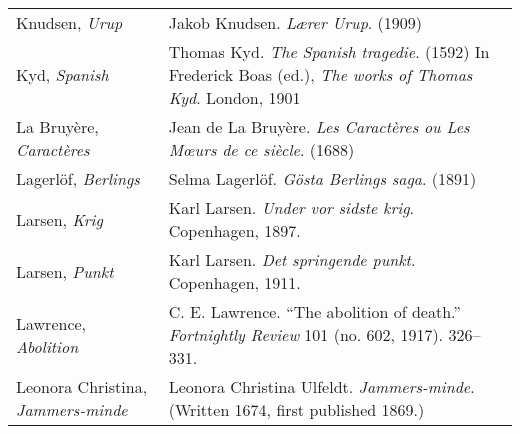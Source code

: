 \begin{longtable}{p{} p{}}
Knudsen, \textit{Urup} & Jakob Knudsen. \textit{Lærer Urup}. (1909) \\
%

Kyd, \textit{Spanish} & Thomas Kyd. \textit{The Spanish tragedie}. (1592) In Frederick Boas (ed.), \textit{The works of Thomas Kyd}. London, 1901 \\

La Bruyère, \textit{Caractères} & Jean de La Bruyère. \textit{Les Caractères ou Les Mœurs de ce siècle}. (1688) \\

Lagerlöf, \textit{Berlings} & Selma Lagerlöf. \textit{Gösta Berlings saga}. (1891) \\

Larsen, \textit{Krig} & Karl Larsen. \textit{Under vor sidste krig}. Copenhagen, 1897.\\
Larsen, \textit{Punkt} & Karl Larsen. \textit{Det springende punkt}. Copenhagen, 1911.\\

Lawrence, \textit{Abolition} & C. E. Lawrence. ``The abolition of death.'' \textit{Fortnightly Review} 101 (no. 602, 1917). 326--331. \\

\raggedright{Leonora Christina, \textit{Jammers-minde}} & Leonora Christina Ulfeldt. \textit{Jammers-minde}. (Written 1674, first published 1869.) \\


\end{longtable}
